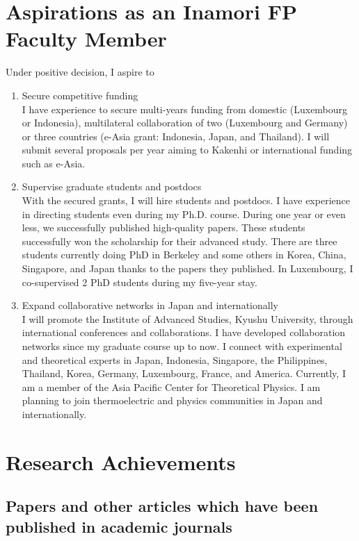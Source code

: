 \documentclass[a4paper,11pt]{article}
\begin{document}
\section{Aspirations as an Inamori FP Faculty Member}
Under positive decision, I  aspire to
\begin{enumerate}
\item Secure competitive funding\\ I have experience to secure
  multi-years funding from domestic (Luxembourg or Indonesia),
  multilateral collaboration of two (Luxembourg and Germany) or three
  countries (e-Asia grant: Indonesia, Japan, and Thailand).  I will submit several proposals per year aiming to Kakenhi or international funding such as e-Asia.

\item Supervise graduate students and postdocs\\
With the secured grants, I will hire students and postdocs. I have experience in directing students even during my Ph.D. course. During one year or even less, we successfully published high-quality papers. These students successfully won the scholarship for their advanced study. There are three students currently doing PhD in Berkeley and some others in Korea, China, Singapore, and Japan thanks to the papers they published.
  In Luxembourg, I co-supervised 2 PhD students during my five-year stay.
\item Expand collaborative networks in Japan and internationally\\
I will promote the Institute of Advanced Studies, Kyushu University, through international conferences and collaborations. I have developed collaboration networks since my graduate course up to now. I connect with experimental and theoretical experts in Japan, Indonesia,
  Singapore, the Philippines, Thailand, Korea, Germany, Luxembourg,
  France, and America. Currently, I am a member of the Asia Pacific Center
for Theoretical Physics. I am planning to join thermoelectric and physics communities in Japan and internationally.
\end{enumerate}
\section{Research Achievements}

\subsection{Papers and other articles which have been published in academic journals   }
\end{document}
